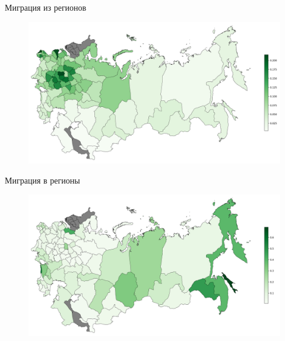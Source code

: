 \documentclass[aspectratio=169]{beamer}
\begin{document}
\begin{frame}{Миграция из регионов}
	
\begin{figure}[h!]
	\includegraphics[height=0.85\textheight]{mig_of_pop_from.png}
\end{figure}
	
\end{frame}

\begin{frame}{Миграция в регионы}
	
\begin{figure}[h!]
	\includegraphics[height=0.85\textheight]{mig_of_pop_to.png}
\end{figure}
	
\end{frame}
\end{document}
